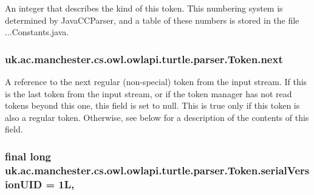 An integer that describes the kind of this token. This numbering system is determined by Java\-C\-C\-Parser, and a table of these numbers is stored in the file ...Constants.\-java. \hypertarget{classuk_1_1ac_1_1manchester_1_1cs_1_1owl_1_1owlapi_1_1turtle_1_1parser_1_1_token_a9294705b3cb5eee387059f9f4502774f}{
\subsubsection[{next}]{ uk.\-ac.\-manchester.\-cs.\-owl.\-owlapi.\-turtle.\-parser.\-Token.\-next}}\label{classuk_1_1ac_1_1manchester_1_1cs_1_1owl_1_1owlapi_1_1turtle_1_1parser_1_1_token_a9294705b3cb5eee387059f9f4502774f}
A reference to the next regular (non-\/special) token from the input stream. If this is the last token from the input stream, or if the token manager has not read tokens beyond this one, this field is set to null. This is true only if this token is also a regular token. Otherwise, see below for a description of the contents of this field. \hypertarget{classuk_1_1ac_1_1manchester_1_1cs_1_1owl_1_1owlapi_1_1turtle_1_1parser_1_1_token_a24a588f84d460d5b57269fece8d6e814}{
\subsubsection[{serial\-Version\-U\-I\-D}]{\setlength{\rightskip}{0pt plus 5cm}final long uk.\-ac.\-manchester.\-cs.\-owl.\-owlapi.\-turtle.\-parser.\-Token.\-serial\-Version\-U\-I\-D = 1\-L\hspace{0.3cm}{\ttfamily [static]}, {\ttfamily [private]}}}\label{classuk_1_1ac_1_1manchester_1_1cs_1_1owl_1_1owlapi_1_1turtle_1_1parser_1_1_token_a24a588f84d460d5b57269fece8d6e814}
